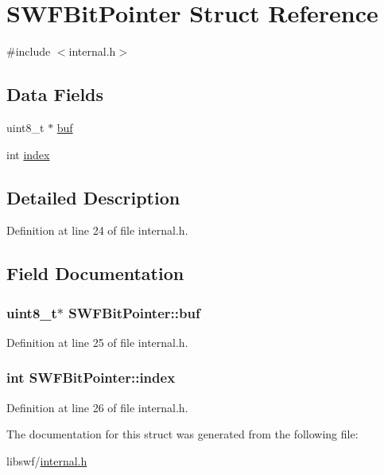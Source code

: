 \hypertarget{struct_s_w_f_bit_pointer}{\section{S\-W\-F\-Bit\-Pointer Struct Reference}
\label{struct_s_w_f_bit_pointer}
}


{\ttfamily \#include $<$internal.\-h$>$}

\subsection*{Data Fields}
\begin{DoxyCompactItemize}
\item 
uint8\-\_\-t $\ast$ \hyperlink{struct_s_w_f_bit_pointer_a31d72997e38753ea1cc6f37c3e912e15}{buf}
\item 
int \hyperlink{struct_s_w_f_bit_pointer_a5bab5b9df82fc3131232aa0823a0e532}{index}
\end{DoxyCompactItemize}


\subsection{Detailed Description}


Definition at line 24 of file internal.\-h.



\subsection{Field Documentation}
\hypertarget{struct_s_w_f_bit_pointer_a31d72997e38753ea1cc6f37c3e912e15}{
\subsubsection[{buf}]{\setlength{\rightskip}{0pt plus 5cm}uint8\-\_\-t$\ast$ S\-W\-F\-Bit\-Pointer\-::buf}}\label{struct_s_w_f_bit_pointer_a31d72997e38753ea1cc6f37c3e912e15}


Definition at line 25 of file internal.\-h.

\hypertarget{struct_s_w_f_bit_pointer_a5bab5b9df82fc3131232aa0823a0e532}{
\subsubsection[{index}]{\setlength{\rightskip}{0pt plus 5cm}int S\-W\-F\-Bit\-Pointer\-::index}}\label{struct_s_w_f_bit_pointer_a5bab5b9df82fc3131232aa0823a0e532}


Definition at line 26 of file internal.\-h.



The documentation for this struct was generated from the following file\-:\begin{DoxyCompactItemize}
\item 
libswf/\hyperlink{internal_8h}{internal.\-h}\end{DoxyCompactItemize}

